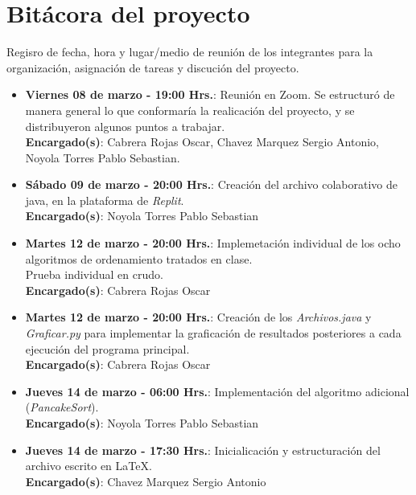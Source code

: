 \documentclass[a4paper,12pt]{article}
\begin{document}
\newpage
\section{Bitácora del proyecto}

Regisro de fecha, hora y lugar/medio de reunión de los integrantes para la organización, asignación de tareas y discución del proyecto.\\

\begin{itemize}
    \item \textbf{Viernes 08 de marzo - 19:00 Hrs.}: Reunión en Zoom. Se estructuró de manera general lo que conformaría la realicación del proyecto, y se distribuyeron algunos puntos a trabajar.\\
    \textbf{Encargado(s)}: Cabrera Rojas Oscar, Chavez Marquez Sergio Antonio, Noyola Torres Pablo Sebastian.
    
    \item \textbf{Sábado 09 de marzo - 20:00 Hrs.}: Creación del archivo colaborativo de java, en la plataforma de \textit{Replit}. \\
    \textbf{Encargado(s)}: Noyola Torres Pablo Sebastian
    
    \item \textbf{Martes 12 de marzo - 20:00 Hrs.}: Implemetación individual de los ocho algoritmos de ordenamiento tratados en clase.\\
    Prueba individual en crudo. \\
    \textbf{Encargado(s)}: Cabrera Rojas Oscar

    \item \textbf{Martes 12 de marzo - 20:00 Hrs.}: Creación de los \textit{Archivos.java} y \textit{Graficar.py} para implementar la graficación de resultados posteriores a cada ejecución del programa principal. \\
    \textbf{Encargado(s)}: Cabrera Rojas Oscar
    
    \item \textbf{Jueves 14 de marzo - 06:00 Hrs.}: Implementación del algoritmo adicional (\textit{PancakeSort}). \\
    \textbf{Encargado(s)}: Noyola Torres Pablo Sebastian
    
    \item \textbf{Jueves 14 de marzo - 17:30 Hrs.}: Inicialicación y estructuración del archivo escrito en \LaTeX. \\
    \textbf{Encargado(s)}: Chavez Marquez Sergio Antonio


\end{itemize}
\end{document}

